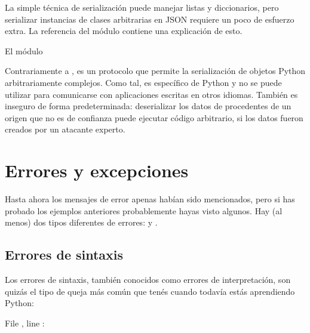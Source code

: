 \documentclass[a5paper,10pt,spanish]{sphinxmanual}
\begin{document}
\sphinxAtStartPar
La simple técnica de serialización puede manejar listas y diccionarios, pero serializar instancias de clases arbitrarias en JSON requiere un poco de esfuerzo extra. La referencia del módulo  contiene una explicación de esto.


\nopagebreak


\sphinxAtStartPar
{}  \sphinxhyphen{} El  módulo 

\sphinxAtStartPar
Contrariamente a {\hyperref[\detokenize{tutorial/inputoutput:tut-json}]{}},  es un protocolo que permite la serialización de objetos Python arbitrariamente complejos.  Como tal, es específico de Python y no se puede utilizar para comunicarse con aplicaciones escritas en otros idiomas.  También es inseguro de forma predeterminada: deserializar los datos de  procedentes de un origen que no es de confianza puede ejecutar código arbitrario, si los datos fueron creados por un atacante experto.




\chapter{Errores y excepciones}
\label{\detokenize{tutorial/errors:errors-and-exceptions}}\label{\detokenize{tutorial/errors:tut-errors}}\label{\detokenize{tutorial/errors::doc}}
\sphinxAtStartPar
Hasta ahora los mensajes de error apenas habían sido mencionados, pero si has probado los ejemplos anteriores probablemente hayas visto algunos.  Hay (al menos) dos tipos diferentes de errores:  y .


\section{Errores de sintaxis}
\label{\detokenize{tutorial/errors:syntax-errors}}\label{\detokenize{tutorial/errors:tut-syntaxerrors}}
\sphinxAtStartPar
Los errores de sintaxis, también conocidos como errores de interpretación, son quizás el tipo de queja más común que tenés cuando todavía estás aprendiendo Python:

\begin{sphinxVerbatim}[commandchars=\\\{\}]
  
  File , line 
      
: 
\end{sphinxVerbatim}
\end{document}

